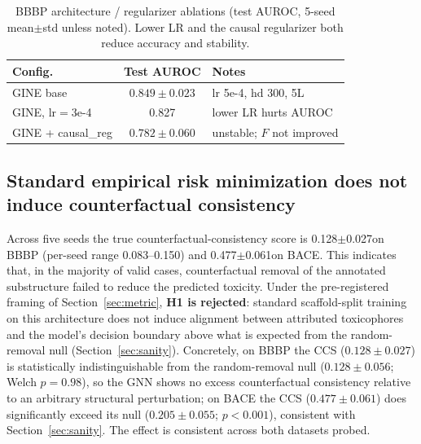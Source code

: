 \documentclass[a4paper,fleqn]{cas-dc}
\newcommand{\Fcausalstd}{0.128}
\newcommand{\Fcausalstdsd}{0.027} %
\newcommand{\BACEcausalstd}{0.477}
\newcommand{\BACEcausalstdsd}{0.061} %
\begin{document}
\begin{table}[t]
\centering
\caption{BBBP architecture / regularizer ablations (test AUROC, 5-seed mean$\pm$std unless noted). Lower LR and the causal regularizer both reduce accuracy and stability.}
\label{tab:abl}
\begin{tabular}{@{}l c l@{}}
\toprule
Config. & Test AUROC & Notes \\
\midrule
GINE base & $0.849\pm0.023$ & lr 5e-4, hd 300, 5L \\
GINE, lr$=$3e-4 & 0.827 & lower LR hurts AUROC \\
GINE + causal\_reg & $0.782\pm0.060$ & unstable; $F$ not improved \\
\bottomrule
\end{tabular}
\end{table}

\subsection{Standard empirical risk minimization does not induce counterfactual consistency}
\label{sec:nullres}
Across five seeds the true counterfactual-consistency score is \Fcausalstd$\pm$\Fcausalstdsd on BBBP (per-seed range 0.083--0.150) and \BACEcausalstd$\pm$\BACEcausalstdsd on BACE. This indicates that, in the majority of valid cases, counterfactual removal of the annotated substructure failed to reduce the predicted toxicity. Under the pre-registered framing of Section~\ref{sec:metric}, \textbf{H1 is rejected}: standard scaffold-split training on this architecture does not induce alignment between attributed toxicophores and the model's decision boundary above what is expected from the random-removal null (Section~\ref{sec:sanity}). Concretely, on BBBP the CCS ($0.128\pm0.027$) is statistically indistinguishable from the random-removal null ($0.128\pm0.056$; Welch $p=0.98$), so the GNN shows no excess counterfactual consistency relative to an arbitrary structural perturbation; on BACE the CCS ($0.477\pm0.061$) does significantly exceed its null ($0.205\pm0.055$; $p<0.001$), consistent with Section~\ref{sec:sanity}. The effect is consistent across both datasets probed.
\end{document}
